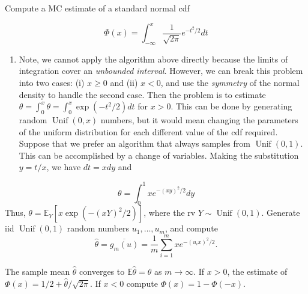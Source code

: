 \documentclass[
  letterpaper,
  DIV=11,
  numbers=noendperiod]{scrreprt}
\providecommand{\tightlist}{%
  \setlength{\itemsep}{0pt}\setlength{\parskip}{0pt}}
\begin{document}
{Compute a MC estimate of a standard normal cdf

\[
\Phi(x)=\int_{-\infty}^x \frac{1}{\sqrt{2 \pi}} e^{-t^2 / 2} d t
\]

\begin{enumerate}
\def\labelenumi{\arabic{enumi}.}
\tightlist
\item
  Note, we cannot apply the algorithm above directly because the limits
  of integration cover an \emph{unbounded interval}. However, we can
  break this problem into two cases: (i) \(x \ge 0\) and (ii) \(x < 0\),
  and use the \emph{symmetry} of the normal density to handle the second
  case. Then the problem is to estimate
  \(\theta =\int_0^x \theta = \int_0^x \exp(−t^2/2) dt\) for \(x > 0\).
  This can be done by generating random \(\operatorname{Unif}(0,x)\)
  numbers, but it would mean changing the parameters of the uniform
  distribution for each different value of the cdf required. Suppose
  that we prefer an algorithm that always samples from
  \(\operatorname{Unif}(0,1)\). This can be accomplished by a change of
  variables. Making the substitution \(y = t/x\), we have \(dt = x dy\)
  and
\end{enumerate}

\[
\theta=\int_0^1 x e^{-(x y)^2 / 2} d y
\] Thus, \(\theta = \mathbb{E}_Y[x\exp(-(xY)^2/2)]\), where the rv
\(Y\sim \operatorname{Unif}(0,1)\). Generate iid
\(\operatorname{Unif}(0,1)\) random numbers \(u_1,\dots,u_m\), and
compute
\[\hat{\theta}=\overline{g_m(u)}=\frac{1}{m} \sum_{i=1}^m x e^{-\left(u_i x\right)^2 / 2}.
\]

The sample mean \(\hat{\theta}\) converges to
\(\mathbb{E}\hat{\theta} = \theta\) as \(m\to \infty\). If \(x > 0\),
the estimate of \(\Phi(x) = 1/2 + \hat{\theta}/\sqrt{2\pi}\). If
\(x < 0\) compute \(\Phi(x) = 1 − \Phi(−x)\).

}
\end{document}
